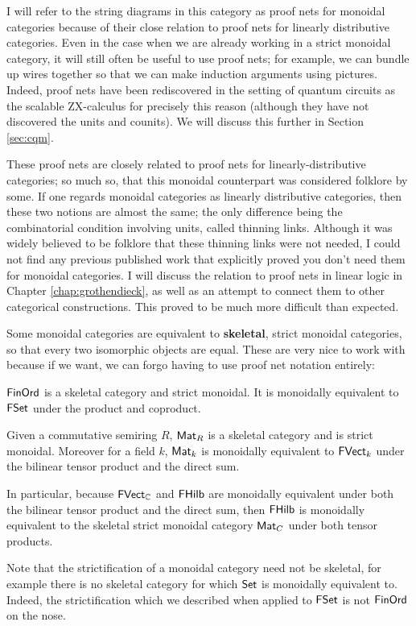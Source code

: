 I will refer to the string diagrams in this category as proof nets for monoidal categories because of their close relation to proof nets for linearly distributive categories.  Even in the case when we are already working in a strict monoidal category, it will still often be useful to use proof nets; for example, we can bundle up wires together so that we can make induction arguments using pictures.  Indeed, proof nets have been rediscovered in the setting of quantum circuits as the scalable ZX-calculus for precisely this reason \cite{szx} (although they have not discovered the units and counits).  We will discuss this further in Section \ref{sec:cqm}.


\begin{aside}
These proof nets are closely related to proof nets for linearly-distributive categories; so much so, that this monoidal counterpart was considered folklore by some.  If one regards monoidal categories as linearly distributive categories, then these two notions are almost the same; the only difference being the combinatorial condition involving units, called thinning links.  Although it was widely believed to be folklore that these thinning links were not needed, I could not find any previous published  work that explicitly proved you don't need them for monoidal categories.  I will discuss the relation to proof nets in linear logic in Chapter \ref{chap:grothendieck}, as well as an attempt to connect them to other categorical constructions.  This proved to be much more difficult than expected.
\end{aside}


Some monoidal categories are equivalent to {\bf skeletal}, strict monoidal categories, so that every two isomorphic objects are equal.  These are very nice to work with because if we want, we can forgo having to use proof net notation entirely:
\begin{example}
$\mathsf{FinOrd}$ is a skeletal category and strict monoidal. It is monoidally equivalent to $\mathsf{FSet}$ under the product and coproduct.


Given a commutative semiring $R$, $\mathsf{Mat}_R$ is a skeletal category and is strict monoidal. Moreover for a field $k$, $\mathsf{Mat}_k$ is monoidally equivalent to $\mathsf{FVect}_k$ under the bilinear tensor product and the direct sum.

In particular, because $\mathsf{FVect}_{\mathbb{C}}$ and $\mathsf{FHilb}$ are monoidally equivalent under both the bilinear tensor product and the direct sum, then $\mathsf{FHilb}$ is monoidally equivalent to the skeletal strict monoidal category $\mathsf{Mat}_C$ under both tensor products.
\end{example}
Note that the strictification of a monoidal category need not be skeletal, for example there is no skeletal category for which $\mathsf{Set}$ is monoidally equivalent to.  Indeed, the strictification which we described when applied to $\mathsf{FSet}$ is not $\mathsf{FinOrd}$ on the nose.


